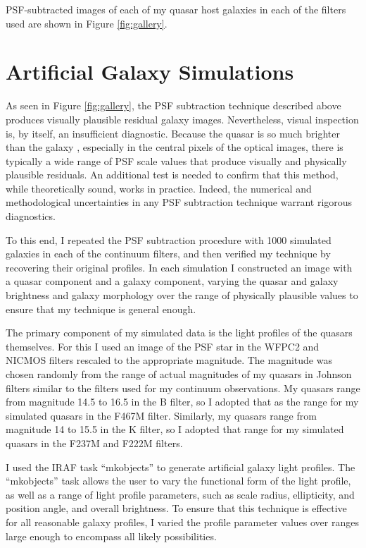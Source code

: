  PSF-subtracted images of each of my quasar host galaxies in each of the filters used are shown in Figure \ref{fig:gallery}.



\section{Artificial Galaxy Simulations}
\label{sec:simulation}

As seen in Figure \ref{fig:gallery}, the PSF subtraction technique described above produces visually plausible residual galaxy images.  Nevertheless, visual inspection is, by itself, an insufficient diagnostic.  Because the quasar is so much brighter than the galaxy \citep{Bahcall,McLeod,Bennert}, especially in the central pixels of the optical images, there is typically a wide range of PSF scale values that produce visually and physically plausible residuals. An additional test is needed to confirm that this method, while theoretically sound, works in practice. Indeed, the numerical and methodological uncertainties in any PSF subtraction technique warrant rigorous diagnostics.

To this end, I repeated the PSF subtraction procedure with 1000 simulated galaxies in each of the continuum filters, and then verified my technique by recovering their original profiles.  In each simulation I constructed an image with a quasar component and a galaxy component, varying the quasar and galaxy brightness and galaxy morphology over the range of physically plausible values to ensure that my technique is general enough.

The primary component of my simulated data is the light profiles of the quasars themselves. For this I used an image of the PSF star in the WFPC2 and NICMOS filters rescaled to the appropriate magnitude. The magnitude was chosen randomly from the range of actual magnitudes of my quasars in Johnson filters similar to the filters used for my continuum observations.  My quasars range from magnitude 14.5 to 16.5 in the B filter, so I adopted that as the range for my simulated quasars in the F467M filter.  Similarly, my quasars range from magnitude 14 to 15.5 in the K filter, so I adopted that range for my simulated quasars in the F237M and F222M filters.

I used the IRAF task ``mkobjects'' to generate artificial galaxy light profiles. The ``mkobjects'' task allows the user to vary the functional form of the light profile, as well as a range of light profile parameters, such as scale radius, ellipticity, and position angle, and overall brightness. To ensure that this technique is effective for all reasonable galaxy profiles, I varied the profile parameter values over ranges large enough to encompass all likely possibilities.

